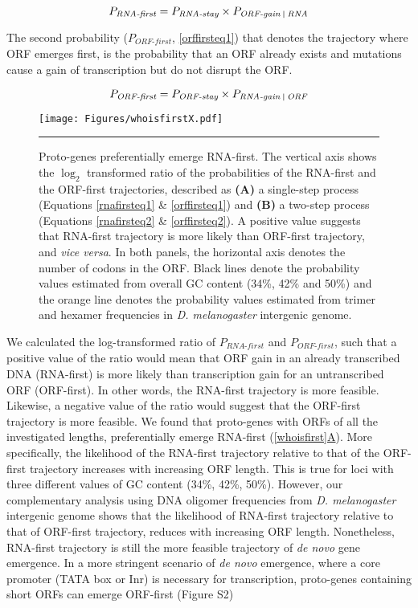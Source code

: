 \documentclass[12pt,a4paper]{article}
\newcommand{\cmnt}[1]{{\color{purple} #1}}
\begin{document}
\begin{equation}
P_\textit{RNA-first} = P_\textit{RNA-stay}\times P_\textit{ORF-gain \vline\ RNA}
\label{rnafirsteq1}
\end{equation}

The second probability ($P_\textit{ORF-first}$, \autoref{orffirsteq1}) that denotes the trajectory where ORF emerges first, is the probability that an ORF already exists and mutations cause a gain of transcription but do not disrupt the ORF.

\begin{equation}
P_\textit{ORF-first} = P_\textit{ORF-stay}\times P_\textit{RNA-gain \vline\ ORF}
\label{orffirsteq1}
\end{equation}


\begin{figure}[!t]
\centering
\texttt{[image: Figures/whoisfirstX.pdf]}
\caption{Proto-genes preferentially emerge RNA-first. The vertical axis shows the $\log_2$ transformed ratio of the probabilities of the RNA-first and the ORF-first trajectories, described as \textbf{(A)} a single-step process (Equations \ref{rnafirsteq1} \& \ref{orffirsteq1}) and \textbf{(B)} a two-step process (Equations \ref{rnafirsteq2} \& \ref{orffirsteq2}). A positive value suggests that RNA-first trajectory is more likely than ORF-first trajectory, and \textit{vice versa}. In both panels, the horizontal axis denotes the number of codons in the ORF. Black lines denote the probability values estimated from overall GC content (34\%, 42\% and 50\%) and the orange line denotes the probability values estimated from trimer and hexamer frequencies in \textit{D. melanogaster} intergenic genome.}
\label{whoisfirst}
\vspace{1ex}
\hrule
\end{figure}

\cmnt{We calculated the log-transformed ratio of $P_\textit{RNA-first}$ and $P_\textit{ORF-first}$, such that a positive value of the ratio would mean that ORF gain in an already transcribed DNA (RNA-first) is more likely than transcription gain for an untranscribed ORF (ORF-first). In other words, the RNA-first trajectory is more feasible. Likewise, a negative value of the ratio would suggest that the ORF-first trajectory is more feasible. We found that proto-genes with ORFs of all the investigated lengths, preferentially emerge RNA-first (\hyperref[whoisfirst]{\autoref{whoisfirst}A}). More specifically, the likelihood of the RNA-first trajectory relative to that of the ORF-first trajectory  increases with increasing ORF length. This is true for loci with three different values of GC content (34\%, 42\%, 50\%). However, our complementary analysis using DNA oligomer frequencies from \textit{D. melanogaster} intergenic genome shows that the likelihood of RNA-first trajectory relative to that of ORF-first trajectory, reduces with increasing ORF length. Nonetheless, RNA-first trajectory is still the more feasible trajectory of \textit{de novo} gene emergence. In a more stringent scenario of \textit{de novo} emergence, where a core promoter (TATA box or Inr) is necessary for transcription, proto-genes containing short ORFs can emerge ORF-first ({\color{blue}Figure S2})} 
\end{document}
